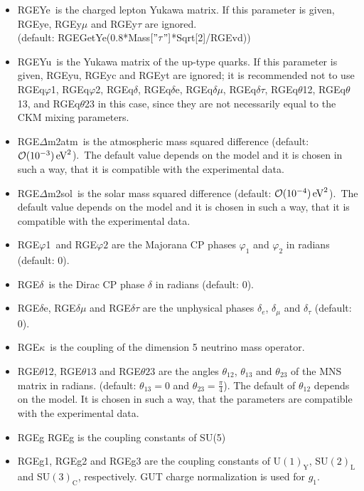 \documentclass[10pt,a4paper,twoside]{scrartcl}
\begin{document}
\begin{itemize}
\item RGEYe\ is the charged lepton Yukawa matrix.
  If this parameter is given, RGEye, RGEy$\mu$ and RGEy$\tau$ are
  ignored.
    \\ (default:
  RGEGetYe(0.8*Mass$\left[\mathrm{"}\tau\mathrm{"}\right]$*Sqrt[2]/RGEvd))
  
\item RGEYu\ is the Yukawa matrix of the up-type quarks.
  If this parameter is given, RGEyu, RGEyc and RGEyt are ignored;
  it is recommended not to use RGEq$\varphi$1, RGEq$\varphi$2,
  RGEq$\delta$, RGEq$\delta$e, RGEq$\delta\mu$, RGEq$\delta\tau$,
  RGEq$\theta$12, RGEq$\theta$13, and RGEq$\theta$23 in this case, since
  they are not necessarily equal to the CKM mixing parameters.
\item RGE$\Delta$m2atm\ is the atmospheric mass squared difference (default: $ \mathcal{O}(10^{-3}) \,\mathrm{eV}^2$).\ The default value depends on the
  model and it is chosen in such a way, that it is compatible with the
  experimental data.
  
\item RGE$\Delta$m2sol\ is the solar mass squared difference (default:
  $\mathcal{O}(10^{-4}) \,\mathrm{eV}^2$).\ The default value depends on the
  model and it is chosen in such a way, that it is compatible with the
  experimental data.
\item RGE$\varphi$1\ and RGE$\varphi2$ are the Majorana CP phases $\varphi_1$ and $\varphi_2$ in radians (default: $0$).
  
\item RGE$\delta$\ is the Dirac CP phase $\delta$ in radians (default: $0$).
\item RGE$\delta$e, RGE$\delta\mu$ and RGE$\delta\tau$ are the unphysical phases $\delta_e$,
  $\delta_\mu$ and $\delta_\tau$ (default: $0$). 
\item RGE$\kappa$\ is the coupling of the dimension 5 neutrino mass operator.
  
\item RGE$\theta$12, RGE$\theta13$ and RGE$\theta23$ are the angles $\theta_{12}$, $\theta_{13}$
and $\theta_{23}$ of the MNS matrix in radians. (default: $\theta_{13}=0$ and
$\theta_{23}=\frac{\pi}{4}$). The default of $\theta_{12}$ depends on the
model. It is chosen in such a way, that the parameters are compatible with the
experimental data. 
\item RGEg RGEg is the coupling constants of SU(5)
  
\item RGEg1, RGEg2 and RGEg3 are the coupling constants of U$(1)_\mathrm{Y}$,
  SU$(2)_\mathrm{L}$ and SU$(3)_\mathrm{C}$, respectively.  GUT charge
  normalization is used for $g_1$.
  

\end{itemize}
\end{document}
